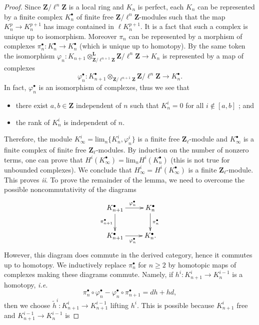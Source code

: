 \begin{proof}
Since $\mathbf{Z}/\ell^n\mathbf{Z}$ is a local ring and $K_n$ is perfect, each 
$K_n$ can be represented by a finite complex $K_n^\bullet$ of finite free 
$\mathbf{Z}/\ell^n \mathbf{Z}$-modules such that the map $K_n^p \to K_n^{p+1}$ 
has image contained in $\ell K_n^{p+1}$. It is a fact that such a complex is 
unique up to isomorphism. Moreover $\pi_n$ can be represented by a morphism of 
complexes $\pi_n^\bullet: K_n^\bullet\to K_n^\bullet$ (which is unique up to 
homotopy). By the same token the isomorphism 
$\varphi_n:K_{n+1}\otimes_{\mathbf{Z}/\ell^{n+1}\mathbf{Z}}^{\mathbf{L}} 
\mathbf{Z}/\ell^n\mathbf{Z}\to K_n$ is represented by a map of complexes
$$
\varphi_n^\bullet: 
K_{n+1}^\bullet\otimes_{\mathbf{Z}/\ell^{n+1}\mathbf{Z}}\mathbf{Z}/\ell^n\mathbf
{Z}\to K_n^\bullet.
$$
In fact, $\varphi_n^\bullet$ is an isomorphism of complexes, thus we see that 
\begin{itemize}
\item
there exist $a, b\in \mathbf{Z}$ independent of $n$ such that $K_n^i = 0$ for 
all $i\notin[a, b]$ ; and 
\item 
the rank of $K_n^i$ is independent of $n$.
\end{itemize}	
Therefore, the module $K_\infty^i = \text{lim}_n \{K_n^i, \varphi_n^i\}$ is a 
finite free $\mathbf{Z}_\ell$-module and $K_\infty^\bullet$ is a finite complex 
of finite free $\mathbf{Z}_\ell$-modules. By induction on the number of nonzero 
terms, one can prove that $H^i\left(K_\infty^\bullet\right) = \text{lim}_n 
H^i\left(K_n^\bullet\right)$ (this is not true for unbounded complexes). We 
conclude that $H_\infty^i = H^i\left(K_\infty^\bullet\right)$ is a finite 
$\mathbf{Z}_\ell$-module. This proves {\it ii}. To prove the remainder of the 
lemma, we need to overcome the possible noncommutativity of the diagrams
$$
\xymatrix{
{K_{n+1}^\bullet} \ar_{\pi_{n+1}^\bullet}[d] \ar^{\varphi_n^\bullet}[r] & 
{K_n^\bullet} \ar^{\pi_n^\bullet}[d] \\
{K_{n+1}^\bullet} \ar_{\varphi_n^\bullet}[r] & {K_n^\bullet.}
}
$$
However, this diagram does commute in the derived category, hence it commutes 
up to homotopy. We inductively replace $\pi_n^\bullet$ for $n\geq 2$ by 
homotopic maps of complexes making these diagrams commute. Namely, if $h^i: 
K_{n+1}^i \to K_n^{i-1}$ is a homotopy, {\it i.e.}
$$
\pi_n^\bullet\circ\varphi_n^\bullet-\varphi_n^\bullet\circ\pi_{n+1}^\bullet = 
dh+hd,
$$
then we choose $\tilde h^i: K_{n+1}^i\to K_{n+1}^{i-1}$ lifting $h^i$. This is 
possible because $K_{n+1}^i$ free and $K_{n+1}^{i-1}\to K_n^{i-1}$ is 

\end{proof}
